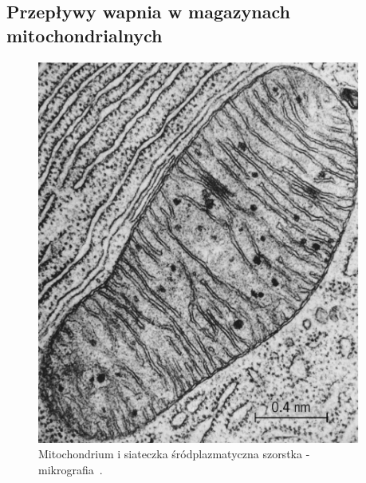 \subsection{Przepływy wapnia w magazynach mitochondrialnych}\label{ss:transportmito}


\begin{figure}[tb]
 \begin{center}
  \includegraphics[width=0.95\textwidth]{rysunki/rozdzial_1/mitochondrium.jpg}
 \end{center}
 \caption[Mitochondrium i ER - mikrografia]{Mitochondrium i siateczka śródplazmatyczna szorstka - mikrografia~\cite{Scheffler1999}.}
 \label{fig:mitoER}
\end{figure}

